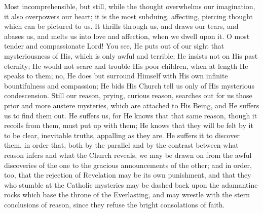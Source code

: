 Most incomprehensible, but still, while the thought overwhelms our
imagination, it also overpowers our heart; it is the most subduing,
affecting, piercing thought which can be pictured to us. It thrills
through us, and draws our tears, and abases us, and melts us into love
and affection, when we dwell upon it. O most tender and compassionate
Lord! You see, He puts out of our sight that mysteriousness of His,
which is only awful and terrible; He insists not on His past eternity;
He would not scare and trouble His poor children, when at length He
speaks to them; no, He does but surround Himself with His own infinite
bountifulness and compassion; He bids His Church tell us only of His
mysterious condescension. Still our reason, prying, curious reason,
searches out for us those prior and more austere mysteries, which are
attached to His Being, and He suffers us to find them out. He suffers
us, for He knows that that same reason, though it recoils from them,
must put up with them; He knows that they will be felt by it to be
clear, inevitable truths, appalling as they are. He suffers it to
discover them, in order that, both by the parallel and by the contrast
between what reason infers and what the Church reveals, we may be
drawn on from the awful discoveries of the one to the gracious
announcements of the other; and in order, too, that the rejection of
Revelation may be its own punishment, and that they who stumble at the
Catholic mysteries may be dashed back upon the adamantine rocks which
base the throne of the Everlasting, and may wrestle with the stern
conclusions of reason, since they refuse the bright consolations of
faith.

